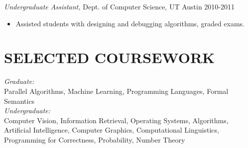 \documentclass[line,margin]{res}
\begin{document}
\begin{resume}
 
                {\sl Undergraduate Assistant, } Dept. of Computer Science, UT Austin \hfill        2010-2011
                  \begin{itemize} \itemsep -2pt
                   \item Assisted students with designing and debugging algorithms, graded exams.
                   \end{itemize} 
 
\section{SELECTED COURSEWORK} {\sl Graduate:} \\ Parallel Algorithms, Machine Learning, Programming Languages, Formal Semantics \\
															{\sl Undergraduate:} \\ Computer Vision, Information Retrieval, Operating Systems, Algorithms, 
															Artificial Intelligence, Computer Graphics, Computational Linguistics, Programming for Correctness, 
															Probability, Number Theory \\

                           
\iffalse
\section{EXTRA-CURRICULAR \\ ACTIVITIES}            
								{\sl Recipient,} Chevron Scholarship (2012) \\
								{\sl Recipient,} Tracor/Frank McBee, Jr. Scholarship (2011) \\
                Association for Computing Machinery \\
								Undergraduate Philosophy Association \\
								Longhorn Billiards Club
                \fi
\end{resume}
\end{document}
